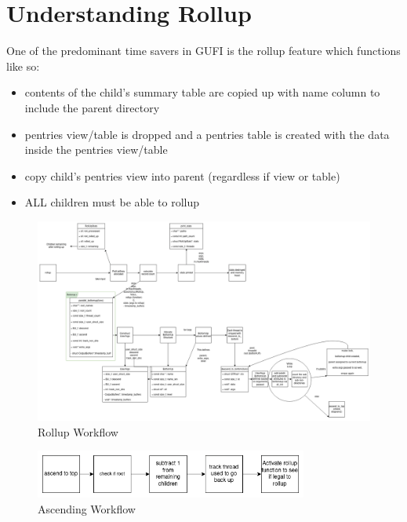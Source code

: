 \section{Understanding Rollup}
One of the predominant time savers in GUFI is the rollup feature which functions like so: \\
\begin{itemize}
  \item contents of the child's summary table are copied up with name column to include the parent directory
  \item pentries view/table is dropped and a pentries table is created with the data inside the pentries view/table
  \item copy child's pentries view into parent (regardless if view or table)
  \item ALL children must be able to rollup
\end{itemize}


\begin{figure} [h]
\centering
\includegraphics[width=1.2\textwidth]{images/rollup.png}
\caption{\label{fig:rollup}Rollup Workflow}
\end{figure}


\begin{figure} [h]
\centering
\includegraphics[width=0.8\textwidth]{images/ascending.png}
\caption{\label{fig:gufi_query} Ascending Workflow}
\end{figure}

\clearpage